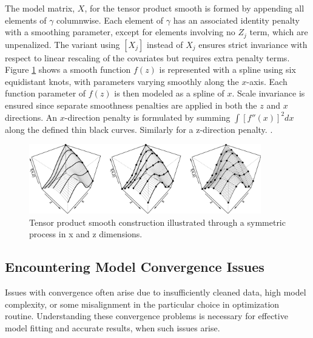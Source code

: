 \documentclass[12pt, twoside,hidelinks]{article}
\theoremstyle{definition}
\numberwithin{equation}{section}
\begin{document}
The model matrix, \( X \), for the tensor product smooth is formed by appending all elements of \( \gamma \) columnwise. Each element of \( \gamma \) has an associated identity penalty with a smoothing parameter, except for elements involving no \( Z_j \) term, which are unpenalized. The variant using \( [X_j] \) instead of \( X_j \) ensures strict invariance with respect to linear rescaling of the covariates but requires extra penalty terms. 
\newline
Figure \ref{fig:tps} shows a smooth function \(f(z)\) is represented with a spline using six equidistant knots, with parameters varying smoothly along the \(x\)-axis. Each function parameter of \(f(z)\) is then modeled as a spline of \(x\). Scale invariance is ensured since separate smoothness penalties are applied in both the \(z\) and \(x\) directions. An \(x\)-direction penalty is formulated by summing \(\int \left[ f''(x) \right]^2 dx\) along the defined thin black curves. Similarly for a z-direction penalty.   \citet{wood2020}.

\begin{figure}[H]
    \centering
    \includegraphics[width=0.9\textwidth]{visuals/Theory/tensor_product_smooth.png}
    \caption{Tensor product smooth construction illustrated through a symmetric process in x and z dimensions.}
    \label{fig:tps}
\end{figure}

\newpage


\subsection{Encountering Model Convergence Issues}\label{sec:research:convergenceissues}



Issues with convergence often arise due to insufficiently cleaned data, high model complexity, or some misalignment in the particular choice in optimization routine. Understanding these convergence problems is necessary for effective model fitting and accurate results, when such issues arise.
\newline
\end{document}
